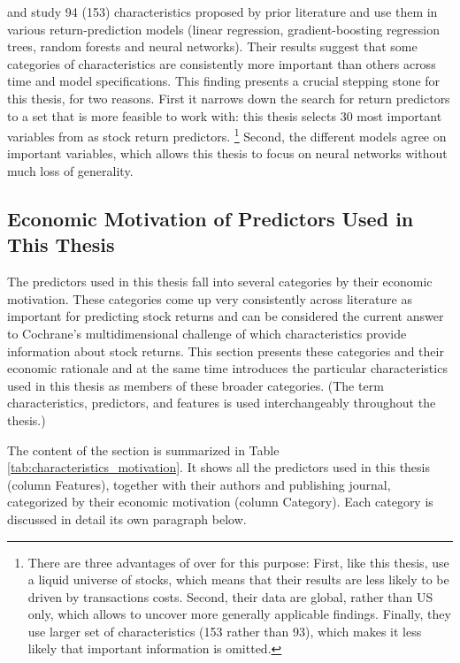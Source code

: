			\cite{gu2020empirical} and \cite{tobek2020does} study 94 (153) characteristics proposed by prior literature and use them in various return-prediction models (linear regression, gradient-boosting regression trees, random forests and neural networks). Their results suggest that some categories of characteristics are consistently more important than others across time and model specifications. This finding presents a crucial stepping stone for this thesis, for two reasons. First it narrows down the search for return predictors to a set that is more feasible to work with: this thesis selects 30 most important variables from \cite{tobek2020does} as stock return predictors. \footnote{There are three advantages of \cite{tobek2020does} over \cite{gu2020empirical} for this purpose: First, like this thesis,  \cite{tobek2020does} use a liquid universe of stocks, which means that their results are less likely to be driven by transactions costs. Second, their data are global, rather than US only, which allows to uncover more generally applicable findings. Finally, they use larger set of characteristics (153 rather than 93), which makes it less likely that important information is omitted.} Second, the different models agree on important variables, which allows this thesis to focus on neural networks without much loss of generality. 
		
		\subsection {Economic Motivation of Predictors Used in This Thesis}
			\label{chap:economic_motivation_of_predictors}
			The predictors used in this thesis fall into several categories by their economic motivation. These categories come up very consistently across literature as important for predicting stock returns \cite{gu2020empirical, tobek2020does, harvey2016and, mclean2016does} and can be considered the current answer to Cochrane's multidimensional challenge of which characteristics provide information about stock returns. This section presents these categories and their economic rationale and at the same time introduces the particular characteristics used in this thesis as members of these broader categories. (The term characteristics, predictors, and features is used interchangeably throughout the thesis.)
			
			The content of the section is summarized in Table \ref{tab:characteristics_motivation}. It shows all the predictors used in this thesis (column Features), together with their authors and publishing journal, categorized by their economic motivation (column Category). Each category is discussed in detail its own paragraph below. 
			
